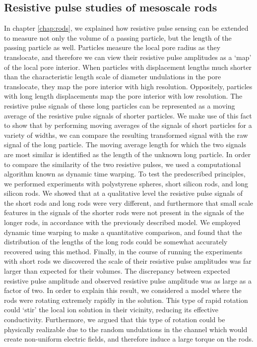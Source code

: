 	\subsection{Resistive pulse studies of mesoscale rods}
	
		In chapter \ref{chap:rods}, we explained how resistive pulse sensing can be extended to measure not only the volume of a passing particle, but the length of the passing particle as well. Particles measure the local pore radius as they translocate, and therefore we can view their resistive pulse amplitudes as a `map' of the local pore interior. When particles with displacement lengths much shorter than the characteristic length scale of diameter undulations in the pore translocate, they map the pore interior with high resolution. Oppositely, particles with long length displacements map the pore interior with low resolution. The resistive pulse signals of these long particles can be represented as a moving average of the resistive pulse signals of shorter particles. We make use of this fact to show that by performing moving averages of the signals of short particles for a variety of widths, we can compare the resulting transformed signal with the raw signal of the long particle. The moving average length for which the two signals are most similar is identified as the length of the unknown long particle. In order to compare the similarity of the two resistive pulses, we used a computational algorithm known as dynamic time warping. To test the predescribed principles, we performed experiments with polystyrene spheres, short silicon rods, and long silicon rods. We showed that at a qualitative level the resistive pulse signals of the short rods and long rods were very different, and furthermore that small scale features in the signals of the shorter rods were not present in the signals of the longer rods, in accordance with the previously described model. We employed dynamic time warping to make a quantitative comparison, and found that the distribution of the lengths of the long rods could be somewhat accurately recovered using this method. Finally, in the course of running the experiments with short rods we discovered the scale of their resistive pulse amplitudes was far larger than expected for their volumes. The discrepancy between expected resistive pulse amplitude and observed resistive pulse amplitude was as large as a factor of two. In order to explain this result, we considered a model where the rods were rotating extremely rapidly in the solution. This type of rapid rotation could `stir' the local ion solution in their vicinity, reducing its effective conductivity. Furthermore, we argued that this type of rotation could be physically realizable due to the random undulations in the channel which would create non-uniform electric fields, and therefore induce a large torque on the rods.
		
